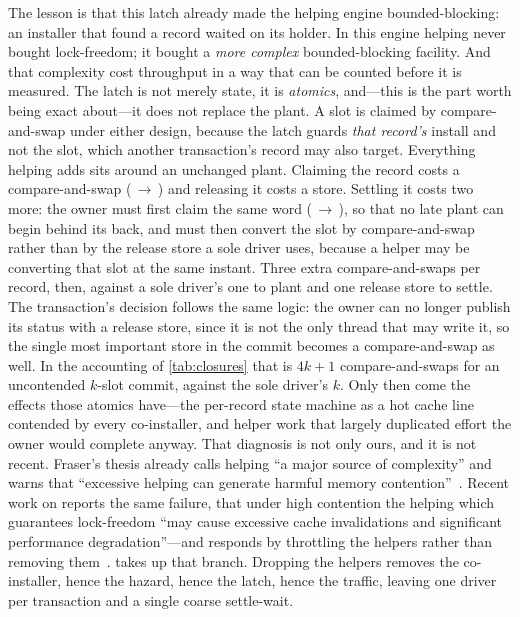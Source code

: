 \documentclass[11pt]{article}
\begin{document}
The lesson is that this latch already made the helping engine bounded-blocking:
an installer that found a record  waited on its holder. In this
engine helping never
bought lock-freedom; it bought a \emph{more complex} bounded-blocking facility.
And that complexity cost throughput in a way that can be counted before it is
measured. The latch is not merely state, it is \emph{atomics}, and---this is the
part worth being exact about---it does not replace the plant. A slot is claimed
by compare-and-swap under either design, because the latch guards \emph{that
record's} install and not the slot, which another transaction's record may also
target. Everything helping adds sits around an unchanged plant. Claiming the
record costs a compare-and-swap (\,$\to$\,) and
releasing it costs a store. Settling it costs two more: the owner must first
claim the same word (\,$\to$\,), so that no late plant
can begin behind its back, and must then convert the slot by compare-and-swap
rather than by the release store a sole driver uses, because a helper may be
converting that slot at the same instant. Three extra compare-and-swaps per
record, then, against a sole driver's one to plant and one release store to
settle. The transaction's decision follows the same logic: the owner can no
longer publish its status with a release store, since it is not the only thread
that may write it, so the single most important store in the commit becomes a
compare-and-swap as well. In the accounting of \cref{tab:closures} that is
$4k+1$ compare-and-swaps for an uncontended $k$-slot commit, against the sole
driver's $k$. Only then come the effects those atomics have---the
per-record state machine as a hot cache line contended by every co-installer, and
helper work that largely duplicated effort the owner would complete anyway. That diagnosis is not
only ours, and it is not recent. Fraser's thesis already calls helping ``a major
source of complexity'' and warns that ``excessive helping can generate harmful
memory contention''~\citep{fraser2004lockfreedom}. Recent work on \kcas reports
the same failure, that under high
contention the helping which guarantees lock-freedom ``may cause excessive cache
invalidations and significant performance degradation''---and responds by
throttling the helpers rather than removing
them~\citep{unno2026helping}.  takes up that branch.
Dropping the helpers
removes the co-installer, hence the hazard, hence the latch, hence the traffic,
leaving one driver per transaction and a single coarse settle-wait.
\end{document}
